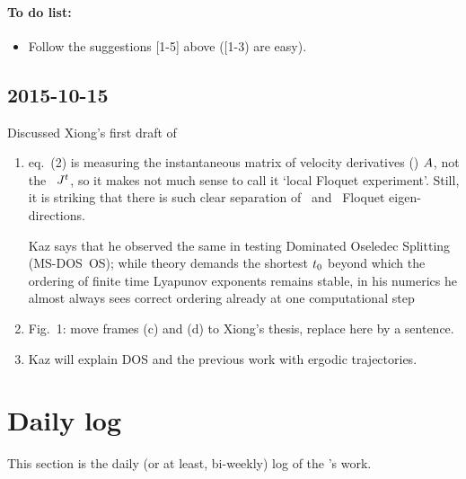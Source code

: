 \paragraph{To do list:}
\begin{itemize}
\item Follow the suggestions [1-5] above ([1-3) are easy).
\end{itemize}

\subsection{2015-10-15}
\label{sect:2015-10-15}

Discussed Xiong's first draft of 

\begin{enumerate}
  \item
eq.~(2) is measuring the instantaneous matrix of velocity derivatives
(\stabmat) $A$, not the \jacobianM\ ${J}^{t}$, so it makes not
much sense to call it `local Floquet experiment'. Still, it is striking
that there is such clear separation of \entangled\ and \transient\
Floquet eigen-directions.

Kaz says that he observed the same in testing Dominated Oseledec
Splitting (MS-DOS~OS); while theory demands the shortest $t_0$ beyond
which the ordering of finite time Lyapunov exponents remains stable, in
his numerics he almost always sees correct ordering already at one
computational step
  \item
Fig.~1: move frames (c) and (d) to Xiong's thesis, replace here by a
sentence.
  \item
Kaz will explain DOS and the previous work with ergodic trajectories.
\end{enumerate}


\section{Daily log}
\label{sect:dailyBlXD}

This section is the daily (or at least, bi-weekly)  log of the \XD's
work.

